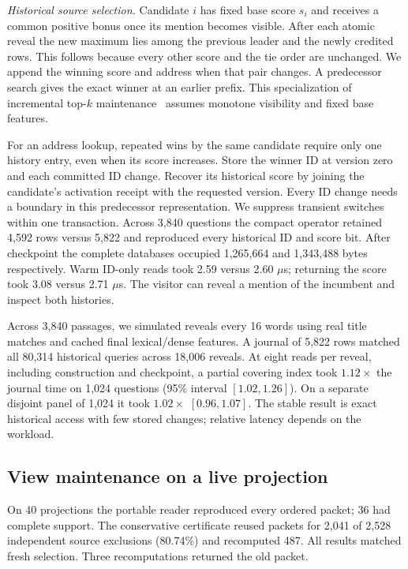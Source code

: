 \documentclass[conference]{IEEEtran}
\begin{document}
\textit{Historical source selection.} Candidate $i$ has fixed base score $s_i$ and receives a common positive bonus once its mention becomes visible. After each atomic reveal the new maximum lies among the previous leader and the newly credited rows. This follows because every other score and the tie order are unchanged. We append the winning score and address when that pair changes. A predecessor search gives the exact winner at an earlier prefix. This specialization of incremental top-$k$ maintenance~\cite{topk} assumes monotone visibility and fixed base features.

For an address lookup, repeated wins by the same candidate require only one history entry, even when its score increases. Store the winner ID at version zero and each committed ID change. Recover its historical score by joining the candidate's activation receipt with the requested version. Every ID change needs a boundary in this predecessor representation. We suppress transient switches within one transaction. Across 3,840 questions the compact operator retained 4,592 rows versus 5,822 and reproduced every historical ID and score bit. After checkpoint the complete databases occupied 1,265,664 and 1,343,488 bytes respectively. Warm ID-only reads took 2.59 versus 2.60 $\mu$s; returning the score took 3.08 versus 2.71 $\mu$s. The visitor can reveal a mention of the incumbent and inspect both histories.

Across 3,840 passages, we simulated reveals every 16 words using real title matches and cached final lexical/dense features. A journal of 5,822 rows matched all 80,314 historical queries across 18,006 reveals. At eight reads per reveal, including construction and checkpoint, a partial covering index took $1.12\times$ the journal time on 1,024 questions (95\% interval $[1.02,1.26]$). On a separate disjoint panel of 1,024 it took $1.02\times$ $[0.96,1.07]$. The stable result is exact historical access with few stored changes; relative latency depends on the workload.

\subsection{View maintenance on a live projection}
On 40 projections the portable reader reproduced every ordered packet; 36 had complete support. The conservative certificate reused packets for 2,041 of 2,528 independent source exclusions (80.74\%) and recomputed 487. All results matched fresh selection. Three recomputations returned the old packet.
\end{document}
